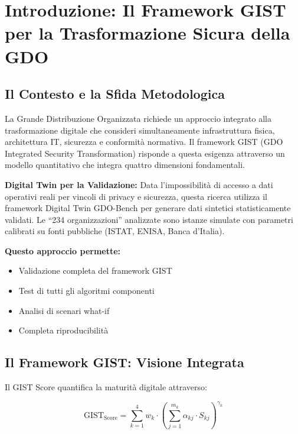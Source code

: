 \chapter{Introduzione: Il Framework GIST per la Trasformazione Sicura della GDO}

\section{Il Contesto e la Sfida Metodologica}

La Grande Distribuzione Organizzata richiede un approccio integrato alla trasformazione digitale che consideri simultaneamente infrastruttura fisica, architettura IT, sicurezza e conformità normativa. Il framework GIST (GDO Integrated Security Transformation) risponde a questa esigenza attraverso un modello quantitativo che integra quattro dimensioni fondamentali.

\begin{tcolorbox}[colback=blue!5!white,colframe=blue!75!black,title=Approccio Metodologico]
\textbf{Digital Twin per la Validazione:} Data l'impossibilità di accesso a dati operativi reali per vincoli di privacy e sicurezza, questa ricerca utilizza il framework Digital Twin GDO-Bench per generare dati sintetici statisticamente validati. Le ``234 organizzazioni'' analizzate sono istanze simulate con parametri calibrati su fonti pubbliche (ISTAT, ENISA, Banca d'Italia).

\textbf{Questo approccio permette:}
\begin{itemize}
    \item Validazione completa del framework GIST
    \item Test di tutti gli algoritmi componenti
    \item Analisi di scenari what-if
    \item Completa riproducibilità
\end{itemize}
\end{tcolorbox}

\section{Il Framework GIST: Visione Integrata}

Il GIST Score quantifica la maturità digitale attraverso:

\begin{equation}
\text{GIST}_{\text{Score}} = \sum_{k=1}^{4} w_k \cdot \left(\sum_{j=1}^{m_k} \alpha_{kj} \cdot S_{kj}\right)^{\gamma_k}
\label{eq:gist-score}
\end{equation}

